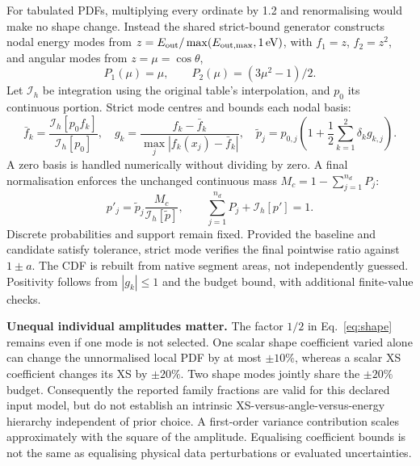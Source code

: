 For tabulated PDFs, multiplying every ordinate by 1.2 and renormalising would make no shape change. Instead the shared strict-bound generator constructs nodal energy modes from $z=E_{\rm out}/\max(E_{\rm out,max},1\,\mathrm{eV})$, with $f_1=z$, $f_2=z^2$, and angular modes from $z=\mu=\cos\theta$,
\begin{equation}
P_1(\mu)=\mu,\qquad P_2(\mu)=(3\mu^2-1)/2.
\end{equation}
Let $\mathcal I_h$ be integration using the original table's interpolation, and $p_0$ its continuous portion. Strict mode centres and bounds each nodal basis:
\begin{equation}
\bar f_k=\frac{\mathcal I_h[p_0 f_k]}{\mathcal I_h[p_0]},\quad
 g_k=\frac{f_k-\bar f_k}{\max_j|f_k(x_j)-\bar f_k|},\quad
\widetilde p_j=p_{0,j}\left(1+\frac12\sum_{k=1}^{2}\delta_k g_{k,j}\right).\label{eq:shape}
\end{equation}
A zero basis is handled numerically without dividing by zero. A final normalisation enforces the unchanged continuous mass $M_c=1-\sum_{j=1}^{n_d}P_j$:
\begin{equation}
p'_j=\widetilde p_j\frac{M_c}{\mathcal I_h[\widetilde p]},\qquad
\sum_{j=1}^{n_d}P_j+\mathcal I_h[p']=1.\label{eq:pdfnorm}
\end{equation}
Discrete probabilities and support remain fixed. Provided the baseline and candidate satisfy tolerance, strict mode verifies the final pointwise ratio against $1\pm a$. The CDF is rebuilt from native segment areas, not independently guessed. Positivity follows from $|g_k|\le1$ and the budget bound, with additional finite-value checks.

\textbf{Unequal individual amplitudes matter.} The factor $1/2$ in Eq.~\eqref{eq:shape} remains even if one mode is not selected. One scalar shape coefficient varied alone can change the unnormalised local PDF by at most $\pm10\%$, whereas a scalar XS coefficient changes its XS by $\pm20\%$. Two shape modes jointly share the $\pm20\%$ budget. Consequently the reported family fractions are valid for this declared input model, but do not establish an intrinsic XS-versus-angle-versus-energy hierarchy independent of prior choice. A first-order variance contribution scales approximately with the square of the amplitude. Equalising coefficient bounds is not the same as equalising physical data perturbations or evaluated uncertainties.

